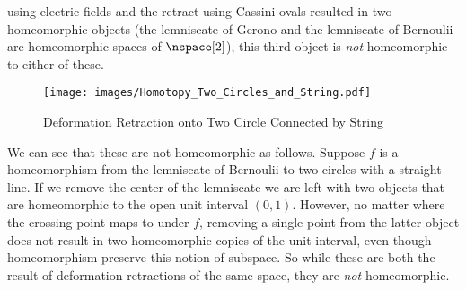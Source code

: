 \documentclass{article}                                                        %
\begin{document}
        using electric fields and the retract using Cassini ovals resulted in
        two homeomorphic objects (the lemniscate of Gerono and the lemniscate
        of Bernoulii are homeomorphic spaces of $\nspace[2]$), this third object
        is \textit{not} homeomorphic to either of these.
        \begin{figure}[H]
            \centering
            \captionsetup{type=figure}
            \texttt{[image: images/Homotopy\_Two\_Circles\_and\_String.pdf]}
            \caption{Deformation Retraction onto Two Circle Connected by String}
            \label{fig:Homotopy_Two_Circles_and_String}
        \end{figure}
        We can see that these are not homeomorphic as follows. Suppose $f$ is a
        homeomorphism from the lemniscate of Bernoulii to two circles with a
        straight line. If we remove the center of the lemniscate we are left
        with two objects that are homeomorphic to the open unit interval
        $(0,1)$. However, no matter where the crossing point maps to under $f$,
        removing a single point from the latter object does not result in two
        homeomorphic copies of the unit interval, even though homeomorphism
        preserve this notion of subspace. So while these are both the result of
        deformation retractions of the same space, they are \textit{not}
        homeomorphic.
\end{document}
